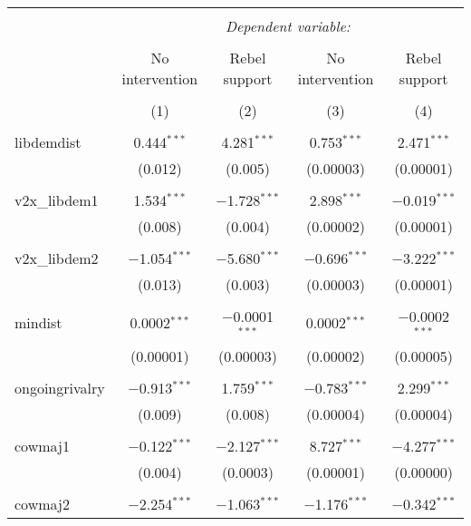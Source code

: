 
\begin{table}[!htbp] \centering 
  \caption{} 
  \label{} 
\begin{tabular}{@{\extracolsep{5pt}}lcccc} 
\\[-1.8ex]\hline 
\hline \\[-1.8ex] 
 & \multicolumn{4}{c}{\textit{Dependent variable:}} \\ 
\cline{2-5} 
\\[-1.8ex] & No intervention & Rebel support & No intervention & Rebel support \\ 
\\[-1.8ex] & (1) & (2) & (3) & (4)\\ 
\hline \\[-1.8ex] 
 libdemdist & 0.444$^{***}$ & 4.281$^{***}$ & 0.753$^{***}$ & 2.471$^{***}$ \\ 
  & (0.012) & (0.005) & (0.00003) & (0.00001) \\ 
  & & & & \\ 
 v2x\_libdem1 & 1.534$^{***}$ & $-$1.728$^{***}$ & 2.898$^{***}$ & $-$0.019$^{***}$ \\ 
  & (0.008) & (0.004) & (0.00002) & (0.00001) \\ 
  & & & & \\ 
 v2x\_libdem2 & $-$1.054$^{***}$ & $-$5.680$^{***}$ & $-$0.696$^{***}$ & $-$3.222$^{***}$ \\ 
  & (0.013) & (0.003) & (0.00003) & (0.00001) \\ 
  & & & & \\ 
 mindist & 0.0002$^{***}$ & $-$0.0001$^{***}$ & 0.0002$^{***}$ & $-$0.0002$^{***}$ \\ 
  & (0.00001) & (0.00003) & (0.00002) & (0.00005) \\ 
  & & & & \\ 
 ongoingrivalry & $-$0.913$^{***}$ & 1.759$^{***}$ & $-$0.783$^{***}$ & 2.299$^{***}$ \\ 
  & (0.009) & (0.008) & (0.00004) & (0.00004) \\ 
  & & & & \\ 
 cowmaj1 & $-$0.122$^{***}$ & $-$2.127$^{***}$ & 8.727$^{***}$ & $-$4.277$^{***}$ \\ 
  & (0.004) & (0.0003) & (0.00001) & (0.00000) \\ 
  & & & & \\ 
 cowmaj2 & $-$2.254$^{***}$ & $-$1.063$^{***}$ & $-$1.176$^{***}$ & $-$0.342$^{***}$ \\ 

\end{tabular}
\end{table}
